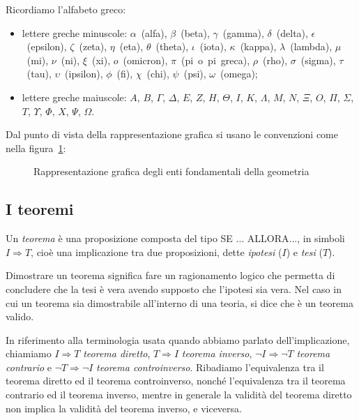 Ricordiamo l'alfabeto greco:
\begin{itemize}
\item lettere greche minuscole:  $\alpha$~(alfa),  $\beta$~(beta),  
$\gamma$~(gamma),  $\delta$~(delta), $\epsilon$~(epsilon), 
$\zeta$~(zeta), $\eta$~(eta), $\theta$~(theta),  $\iota$~(iota),  
$\kappa$~(kappa), $\lambda$~(lambda), $\mu$~(mi), $\nu$~(ni),  
$\xi$~(xi), $o$~(omicron), $\pi$~(pi~o~pi~greca), $\rho$~(rho), 
$\sigma$~(sigma), $\tau$~(tau), $\upsilon$~(ipsilon), $\phi$~(fi), 
$\chi$~(chi), $\psi$~(psi), $\omega$~(omega);
\item lettere greche maiuscole: $A$, $B$, $ \Gamma $, $ \Delta $, $ E 
$, $ Z $, $ H $, $ \Theta $, $ I $, $ K $, $ \Lambda $, $ M $, $ N $, 
$ \Xi $, $ O $, $ \Pi $, $ \Sigma $, $ T $, $ \Upsilon $, $ \Phi $, $ 
X $, $ \Psi $, $\Omega $.
\end{itemize}

Dal punto di vista della rappresentazione grafica si usano le 
convenzioni come nella figura~\ref{fig:1.2}:
% 

\begin{inaccessibleblock}
 \begin{figure}[htb]
 \centering
 \caption{Rappresentazione grafica degli enti fondamentali della 
geometria}\label{fig:1.2}
\end{figure}
\end{inaccessibleblock}



\subsection{I teoremi}

Un \emph{teorema} è una proposizione composta del tipo SE ... ALLORA..., in 
simboli $I\Rightarrow 
T$, cioè una implicazione tra due proposizioni, dette \emph{ipotesi} 
($I$) e \emph{tesi} ($T$).

Dimostrare un teorema significa fare un ragionamento logico che 
permetta di concludere che la tesi è vera avendo supposto che 
l'ipotesi sia vera. Nel caso in cui un teorema sia dimostrabile 
all'interno di una teoria, si dice che è un teorema valido.

In riferimento alla terminologia usata quando abbiamo parlato 
dell'implicazione, chiamiamo  $I\Rightarrow T$ \emph{teorema 
  diretto}, $T\Rightarrow I$ \emph{teorema inverso}, $\neg I\Rightarrow 
\neg T$ \emph{teorema contrario} e $\neg T\Rightarrow \neg I$ 
\emph{teorema controinverso}. Ribadiamo l'equivalenza tra il teorema 
diretto ed il teorema controinverso, nonché l'equivalenza tra il 
teorema contrario ed il teorema inverso, mentre in generale la 
validità del teorema diretto non implica la validità del teorema 
inverso, e viceversa.

